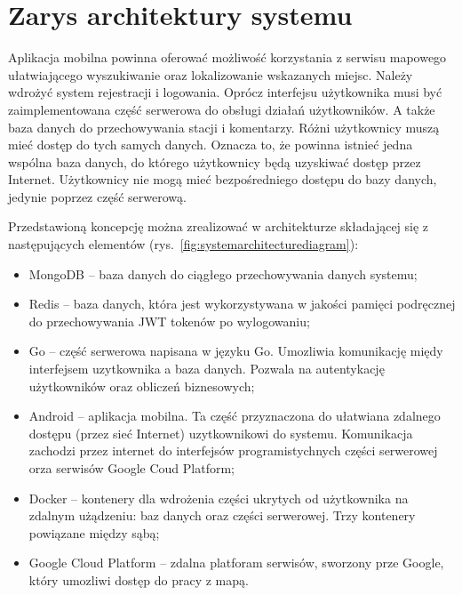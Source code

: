 \section{Zarys architektury systemu}
Aplikacja mobilna powinna oferować możliwość korzystania z serwisu mapowego ułatwiającego wyszukiwanie oraz lokalizowanie wskazanych miejsc.
Należy wdrożyć system rejestracji i logowania. Oprócz interfejsu użytkownika musi być zaimplementowana część serwerowa do obsługi działań użytkowników. A także baza danych do przechowywania stacji i komentarzy.
Różni użytkownicy muszą mieć dostęp do tych samych danych. Oznacza to, że powinna istnieć jedna wspólna baza danych, do którego użytkownicy będą uzyskiwać dostęp przez Internet. Użytkownicy nie mogą mieć bezpośredniego dostępu do bazy danych, jedynie poprzez część serwerową.

Przedstawioną koncepcję można zrealizować w architekturze składającej się z następujących elementów (rys.~\ref{fig:systemarchitecturediagram}):
\begin{itemize}
    \item MongoDB -- baza danych do ciągłego przechowywania danych systemu;
    \item Redis -- baza danych, która jest wykorzystywana w jakości pamięci podręcznej do przechowywania JWT tokenów po wylogowaniu;
    \item Go -- część serwerowa napisana w języku Go. Umozliwia komunikację międy interfejsem uzytkownika a baza danych. Pozwala na autentykację użytkowników oraz obliczeń biznesowych;
    \item Android -- aplikacja mobilna. Ta część przyznaczona do ułatwiana zdalnego dostępu (przez sieć Internet) uzytkownikowi do systemu. Komunikacja zachodzi przez internet do interfejsów programistychnych części serwerowej orza serwisów Google Coud Platform;
    \item Docker -- kontenery dla wdrożenia części ukrytych od użytkownika na zdalnym użądzeniu: baz danych oraz części serwerowej. Trzy kontenery powiązane między sąbą;
    \item Google Cloud Platform -- zdalna platforam serwisów, sworzony prze Google, który umozliwi dostęp do pracy z mapą.
\end{itemize}

